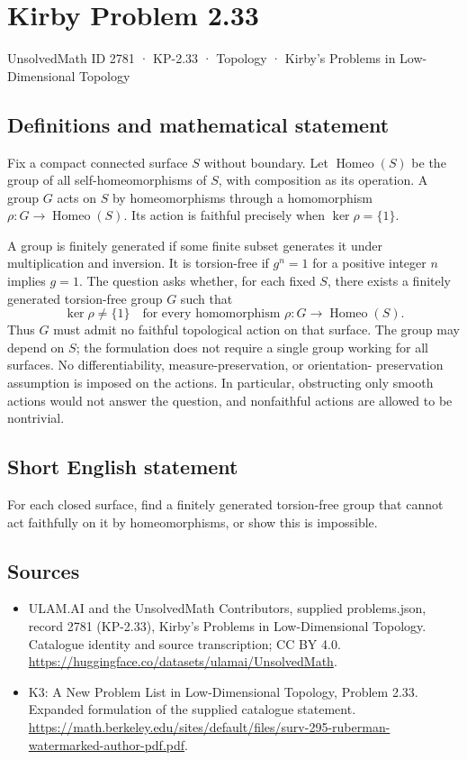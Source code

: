 \documentclass[11pt,a4paper]{article}
\begin{document}
\section*{Kirby Problem 2.33}\label{2781}
{\small UnsolvedMath ID 2781 · KP-2.33 · Topology · Kirby's Problems in Low-Dimensional Topology}
\subsection{Definitions and mathematical statement}
Fix a compact connected surface $S$ without boundary. Let
$\operatorname{Homeo}(S)$ be the group of all self-homeomorphisms of $S$,
with composition as its operation. A group $G$ acts on $S$ by homeomorphisms
through a homomorphism $\rho:G\to\operatorname{Homeo}(S)$. Its action is
faithful precisely when $\ker\rho=\{1\}$.

A group is finitely generated if some finite subset generates it under
multiplication and inversion. It is torsion-free if $g^n=1$ for a positive
integer $n$ implies $g=1$. The question asks whether, for each fixed $S$,
there exists a finitely generated torsion-free group $G$ such that
\[
 \ker\rho\ne\{1\}\quad
 \text{for every homomorphism }\rho:G\to\operatorname{Homeo}(S).
\]
Thus $G$ must admit no faithful topological action on that surface. The group
may depend on $S$; the formulation does not require a single group working
for all surfaces. No differentiability, measure-preservation, or orientation-
preservation assumption is imposed on the actions. In particular, obstructing
only smooth actions would not answer the question, and nonfaithful actions
are allowed to be nontrivial.
\subsection{Short English statement}
For each closed surface, find a finitely generated torsion-free group that cannot act faithfully on it by homeomorphisms, or show this is impossible.
\subsection{Sources}
\begin{itemize}
\item[S1] ULAM.AI and the UnsolvedMath Contributors, supplied problems.json, record 2781 (KP-2.33), Kirby's Problems in Low-Dimensional Topology. Catalogue identity and source transcription; CC BY 4.0.
\url{https://huggingface.co/datasets/ulamai/UnsolvedMath}.
\item[S2] K3: A New Problem List in Low-Dimensional Topology, Problem 2.33. Expanded formulation of the supplied catalogue statement.
\url{https://math.berkeley.edu/sites/default/files/surv-295-ruberman-watermarked-author-pdf.pdf}.
\end{itemize}
\end{document}
